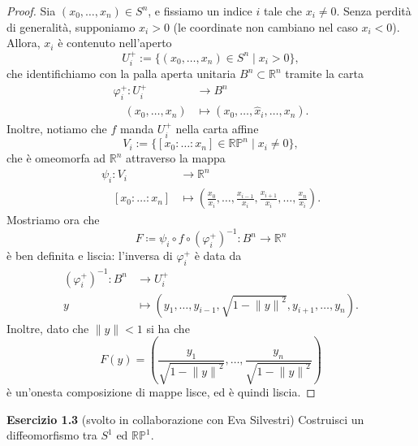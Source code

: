 \documentclass[a4paper]{article}
\newcommand{\R}{\mathbb{R}}
\renewcommand{\P}{\mathbb{P}}
\theoremstyle{definition}
\theoremstyle{definition}
\theoremstyle{remark}
\theoremstyle{definition}
\begin{document}
\begin{proof}
    Sia $(x_0, \ldots, x_n) \in S^n$, e fissiamo un indice $i$ tale che $x_i \neq 0$. Senza perdità di generalità, supponiamo $x_i>0$ (le coordinate non cambiano nel caso $x_i < 0$). Allora, $x_i$ è contenuto nell'aperto
    \[
        U_i^+ := \{ (x_0 , \ldots , x_n) \in S^n \mid x_i > 0 \},
    \]
    che identifichiamo con la palla aperta unitaria $B^n\subset\R^n$ tramite la carta
    \begin{align*}
        \varphi_i^+ : U_i^+        & \to B^n                                    \\
        \quad (x_0 , \ldots , x_n) & \mapsto (x_0,\ldots,\hat{x}_i,\ldots,x_n).
    \end{align*}
    Inoltre, notiamo che $f$ manda $U_i^+$ nella carta affine
    \[
        V_i := \{ [x_0 : \ldots : x_n] \in \R\P^n \mid x_i \neq 0 \}
        ,\]
    che è omeomorfa ad $\R^n$ attraverso la mappa
    \begin{align*}
        \psi_i : V_i               & \longrightarrow \R^n                                                                                                   \\
        \quad [x_0 : \ldots : x_n] & \longmapsto \left( \frac{x_0}{x_i}, \ldots, \frac{x_{i-1}}{x_i}, \frac{x_{i+1}}{x_i}, \ldots, \frac{x_n}{x_i} \right).
    \end{align*}
    Mostriamo ora che
    \[
        F \coloneqq  \psi_i \circ f \circ (\varphi_i^+)^{-1} : B^n \to \R^n
    \]
    è ben definita e liscia: l'inversa di $\varphi_i^+$ è data da
    \begin{align*}
        (\varphi_i^+)^{-1} : B^n & \to U_i^+                                                                                           \\
        y                        & \mapsto \left( y_1, \ldots, y_{i-1}, \sqrt{1 - {\lVert y \rVert}^2 }, y_{i+1}, \ldots, y_n \right).
    \end{align*}
    Inoltre, dato che $\lVert y \rVert < 1$ si ha che
    \[
        F(y) = \left( \frac{y_1}{\sqrt{1 - {\lVert y \rVert}^2 }}, \ldots, \frac{y_n}{\sqrt{1 - {\lVert y \rVert}^2 }} \right)
    \]
    è un'onesta composizione di mappe lisce, ed è quindi liscia.
\end{proof}

\textbf{Esercizio 1.3} (svolto in collaborazione con Eva Silvestri)
Costruisci un diffeomorfismo tra $S^1$ ed $\R\P^1$.
\end{document}
